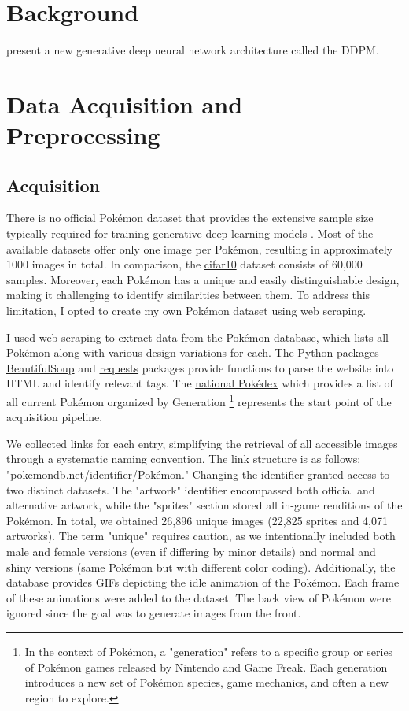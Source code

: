 \documentclass[12pt]{article}
\theoremstyle{plain}
\theoremstyle{definition}
\theoremstyle{remark}
\begin{document}
\section{Background}
\label{sec:background}
\cite{Ho2020} present a new generative deep neural network architecture called the \ac{DDPM}. 
%
\section{Data Acquisition and Preprocessing}
\label{sec:dataAca_and_preprocessing}
\subsection{Acquisition}
There is no official Pokémon dataset that provides the extensive sample size typically required for training generative deep learning models \citep{Yang2023}. Most of the available datasets offer only one image per Pokémon, resulting in approximately 1000 images in total. In comparison, the \href{https://www.cs.toronto.edu/~kriz/cifar.html}{cifar10} dataset consists of 60,000 samples. Moreover, each Pokémon has a unique and easily distinguishable design, making it challenging to identify similarities between them. To address this limitation, I opted to create my own Pokémon dataset using web scraping.

I used web scraping to extract data from the \href{https://pokemondb.net/}{Pokémon database}, which lists all Pokémon along with various design variations for each. The Python packages \href{https://www.crummy.com/software/BeautifulSoup/bs4/doc/}{BeautifulSoup} and \href{https://requests.readthedocs.io/en/latest/}{requests} packages provide functions to parse the website into \ac{HTML} and identify relevant tags. The \href{https://pokemondb.net/pokedex/national}{national Pokédex} which provides a list of all current Pokémon organized by Generation \footnote{In the context of Pokémon, a "generation" refers to a specific group or series of Pokémon games released by Nintendo and Game Freak. Each generation introduces a new set of Pokémon species, game mechanics, and often a new region to explore.} represents the start point of the acquisition pipeline.

We collected links for each entry, simplifying the retrieval of all accessible images through a systematic naming convention. The link structure is as follows: "pokemondb.net/identifier/Pokémon." Changing the identifier granted access to two distinct datasets. The "artwork" identifier encompassed both official and alternative artwork, while the "sprites" section stored all in-game renditions of the Pokémon. In total, we obtained 26,896 unique images (22,825 sprites and 4,071 artworks). The term "unique" requires caution, as we intentionally included both male and female versions (even if differing by minor details) and normal and shiny versions (same Pokémon but with different color coding). Additionally, the database provides GIFs depicting the idle animation of the Pokémon. Each frame of these animations were added to the dataset. The back view of Pokémon were ignored since the goal was to generate images from the front. 
\end{document}
